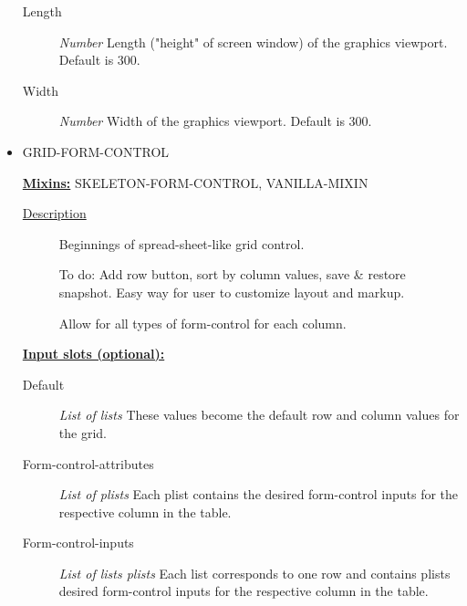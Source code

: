 \documentclass [11pt]{book}
\begin{document}
\begin{itemize}
\begin{description}
\item [Length]
\emph{Number} Length ("height" of screen window) of the graphics viewport. Default is 300.


\item [Width]
\emph{Number} Width of the graphics viewport. Default is 300.


\end{description}







\item {}GRID-FORM-CONTROL


\textbf{
\underline{Mixins:}} SKELETON-FORM-CONTROL, VANILLA-MIXIN





\begin{description}

\item [
\underline{Description}]


Beginnings of spread-sheet-like 
grid control.

To do: Add row button, sort by column values, 
save & restore snapshot. Easy way for user to 
customize layout and markup.

Allow for all types of form-control for each column.





\end{description}








\textbf{
\underline{Input slots (optional):}}

\begin{description}

\item [Default]
\emph{List of lists} These values become the default row and column
values for the grid.


\item [Form-control-attributes]
\emph{List of plists} Each plist contains the desired form-control
inputs for the respective column in the table.


\item [Form-control-inputs]
\emph{List of lists plists} Each list corresponds to one row
and contains plists desired form-control inputs for the
respective column in the table.



\end{description}
\end{itemize}
\end{document}
